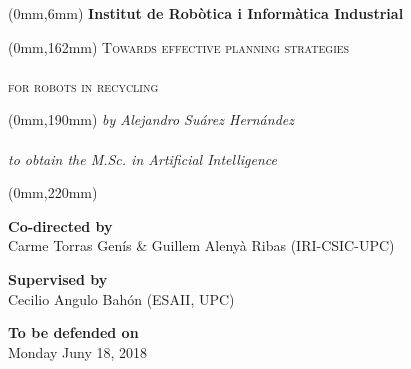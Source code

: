 \begin{titlingpage}
	\AddToShipoutPicture*{\BackgroundPic}
	
	\begin{textblock*}{205mm}(0mm,6mm)
		{\bfseries\sffamily\color{white}\LARGE\null\hfill Institut de Rob\`otica i Inform\`atica Industrial}
	\end{textblock*}
	
	\begin{textblock*}{205mm}(0mm,162mm)
		{\scshape\sffamily\color{white}\Huge\noindent\null\hfill Towards effective planning strategies\\\\%
		\null\hfill for robots in recycling}
	\end{textblock*}
	
	\begin{textblock*}{205mm}(0mm,190mm)
		{\itshape\sffamily\color{white}\LARGE\noindent\null\hfill by Alejandro Su\'arez Hern\'andez \\\\%
		\null\hfill to obtain the M.Sc. in Artificial Intelligence}
	\end{textblock*}
	
	\begin{textblock*}{210mm}(0mm,220mm)
		\begin{center}
		\textbf{Co-directed by}\\
		Carme Torras Gen\'is \& Guillem Aleny\`a Ribas (IRI-CSIC-UPC)
		
		\vspace{0.5cm}
		
		\textbf{Supervised by}\\
		Cecilio Angulo Bah\'on (ESAII, UPC)
		
		\vspace{0.5cm}
		
		\textbf{To be defended on}\\
		Monday Juny 18, 2018
		
		\end{center}
	\end{textblock*}
	
	\mbox{} %

\end{titlingpage}